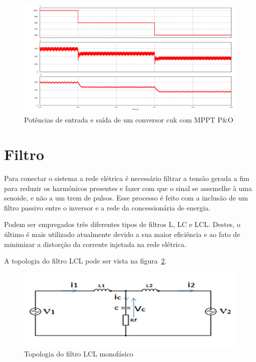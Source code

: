 \documentclass[
	12pt,				%
	openany,
	onseside,
	a4paper,			%
	english,			%
	french,				%
	spanish,			%
	brazil,				%
	]{abntex2}
\begin{document}
\begin{figure}[H]
	\captionsetup{justification=centering}
	\centering
		\includegraphics[width= \linewidth]{mppt_power_demo}
		\caption{Potências de entrada e saída de um conversor cuk com MPPT P\&O}
		\label{fig:mppt_power_demo}
\end{figure}

\section{Filtro}

Para conectar o sistema a rede elétrica é necessário filtrar a tensão gerada a fim para reduzir os harmônicos presentes e fazer com que o sinal se assemelhe à uma senoide, e não a um trem de pulsos. Esse processo é feito com a inclusão de um filtro passivo entre o inversor e a rede da concessionária de energia.

Podem ser empregados três diferentes tipos de filtros L, LC e LCL. Destes, o último é mais utilizado atualmente devido a sua maior eficiência e ao fato de minimizar a distorção da corrente injetada na rede elétrica\cite{LCL_FILTER}\cite{LCL_FILTER_Reznik}.

A topologia do filtro LCL pode ser vista na figura~\ref{fig:lcl_filt_top}.

\begin{figure}[htbp]%
	\centering
		\includegraphics[width=0.7 \linewidth]{lcl_filt_top}
		\caption{Topologia do filtro LCL monofásico\cite{LCL_FILTER}}
		\label{fig:lcl_filt_top}
\end{figure}
\end{document}
